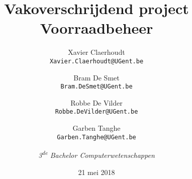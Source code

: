 \documentclass[a4paper,11pt,twoside]{report}
\begin{document}

\title{Vakoverschrijdend project\large \\
Voorraadbeheer}
\author{Xavier Claerhoudt \\
\texttt{Xavier.Claerhoudt@UGent.be}
\and Bram De Smet \\
\texttt{Bram.DeSmet@UGent.be}
\and Robbe De Vilder \\
\texttt{Robbe.DeVilder@UGent.be}
\and Garben Tanghe \\
\texttt{Garben.Tanghe@UGent.be}
\and \textit{3\textsuperscript{de} Bachelor Computerwetenschappen}}
\date{21 mei 2018}
\maketitle

\cleardoublepage


\tableofcontents
\listoffigures
\listoftables




\end{document}
